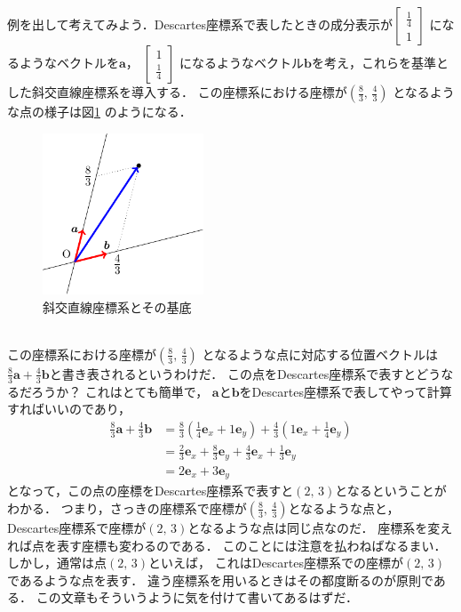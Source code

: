 例を出して考えてみよう．Descartes座標系で表したときの成分表示が$\left[
\begin{array}{c} 
\displaystyle \frac{1}{4} \\
1
\end{array} 
\right]$
になるようなベクトルを$\bm{a}$，
$\left[
\begin{array}{c}
1 \\ 
\displaystyle \frac{1}{4} 
\end{array} 
\right]$
になるようなベクトル$\bm{b}$を考え，これらを基準とした斜交直線座標系を導入する．
この座標系における座標が$\left( \displaystyle \frac{8}{3}, \, \frac{4}{3} \right)$
となるような点の様子は図\ref{fig:syakou}
のようになる．
\begin{figure}[h]
 \begin{center}
 \includegraphics[width=4.8cm]{picture/vecter9.pdf}
 \caption{斜交直線座標系とその基底}
\label{fig:syakou}
 \end{center}
\end{figure}
\\
この座標系における座標が$\left( \displaystyle \frac{8}{3}, \, \frac{4}{3} \right)$
となるような点に対応する位置ベクトルは
$ \displaystyle \frac{8}{3} \bm{a} + \frac{4}{3} \bm{b} $と書き表されるというわけだ．
この点をDescartes座標系で表すとどうなるだろうか？ これはとても簡単で，
$\bm{a}$と$\bm{b}$をDescartes座標系で表してやって計算すればいいのであり，
\begin{align*}
\frac{8}{3} \bm{a} + \frac{4}{3} \bm{b} & = \frac{8}{3} \left( \frac{1}{4} \bm{e}_x + 1 \bm{e}_y \right)
+ \frac{4}{3} \left( 1 \bm{e}_x + \frac{1}{4} \bm{e}_y \right) \\
& = \frac{2}{3} \bm{e}_x + \frac{8}{3} \bm{e}_y + \frac{4}{3} \bm{e}_x +\frac{1}{3} \bm{e}_y \\
& = 2 \bm{e}_x + 3 \bm{e}_y
\end{align*}
となって，この点の座標をDescartes座標系で表すと$(2, \, 3)$となるということがわかる．
つまり，さっきの座標系で座標が$\left( \displaystyle \frac{8}{3}, \, \frac{4}{3} \right) $となるような点と，
Descartes座標系で座標が$(2, \, 3)$となるような点は同じ点なのだ．
座標系を変えれば点を表す座標も変わるのである．
このことには注意を払わねばなるまい．しかし，通常は点$(2, \, 3)$といえば，
これはDescartes座標系での座標が$(2, \, 3)$であるような点を表す．
違う座標系を用いるときはその都度断るのが原則である．
この文章もそういうように気を付けて書いてあるはずだ．

